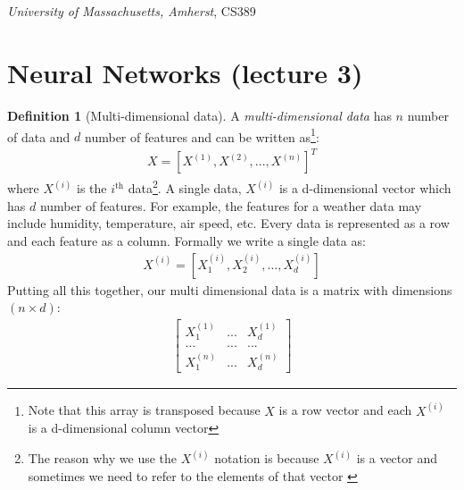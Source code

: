 \documentclass[11pt]{article}
\numberwithin{equation}{section}
\theoremstyle{definition}%
\newtheorem{definition}{Definition}[section]%
\begin{document}
\noindent
\begin{center}
    \section*{}
    \subsection*{}
    \emph{University of Massachusetts, Amherst}, CS389
\end{center}

\section{Neural Networks (lecture 3)}

\begin{definition}[Multi-dimensional data] A \emph{multi-dimensional data} has $n$ number of data and $d$ number of features and can be written as\footnote{Note that this array is transposed because $X$ is a row vector and each $X^{(i)}$ is a d-dimensional column vector}:
    \begin{align}
        X = \left [ X^{(1)}, X^{(2)}, ..., X^{(n)} \right ]^{T}
    \end{align}
where $X^{(i)}$ is the $i^{\text{th}}$ data\footnote{The reason why we use the $X^{(i)}$ notation is because $X^{(i)}$ is a vector and sometimes we need to refer to the elements of that vector \cite{MIT}}. A single data, $X^{(i)}$ is a d-dimensional vector which has $d$ number of features. For example, the features for a weather data may include humidity, temperature, air speed, etc. Every data is represented as a row and each feature as a column. Formally we write a single data as:
    \begin{align}
        X^{(i)} = \left [ X_{1}^{(i)}, X_{2}^{(i)}, ..., X_{d}^{(i)} \right ]
    \end{align}
Putting all this together, our multi dimensional data is a matrix with dimensions $(n \times d)$:
    \begin{align}
        \begin{bmatrix}
            X_{1}^{(1)} & ... & X_{d}^{(1)} \\
            ... & ... & ... \\
            X_{1}^{(n)} & ... & X_{d}^{(n)} 
        \end{bmatrix}
    \end{align}


\end{definition}
\end{document}

